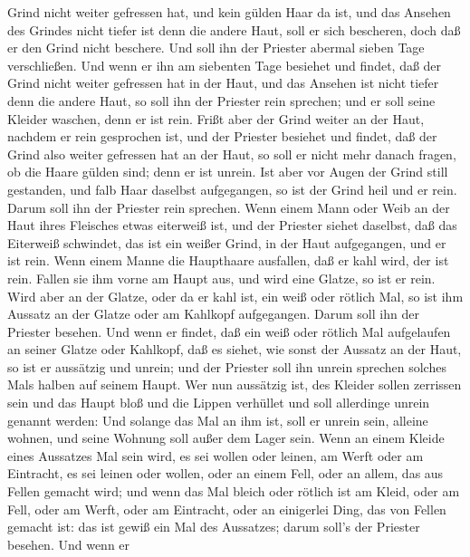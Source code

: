 Grind nicht weiter gefressen hat, und kein gülden Haar da ist, und das
Ansehen des Grindes nicht tiefer ist denn die andere Haut, 
soll er sich bescheren, doch daß er den Grind nicht beschere. Und soll
ihn der Priester abermal sieben Tage verschließen.  Und
wenn er ihn am siebenten Tage besiehet und findet, daß der Grind nicht
weiter gefressen hat in der Haut, und das Ansehen ist nicht tiefer denn
die andere Haut, so soll ihn der Priester rein sprechen; und er soll
seine Kleider waschen, denn er ist rein.  Frißt aber der
Grind weiter an der Haut, nachdem er rein gesprochen ist, 
und der Priester besiehet und findet, daß der Grind also weiter
gefressen hat an der Haut, so soll er nicht mehr danach fragen, ob die
Haare gülden sind; denn er ist unrein.  Ist aber vor Augen
der Grind still gestanden, und falb Haar daselbst aufgegangen, so ist
der Grind heil und er rein. Darum soll ihn der Priester rein sprechen.
 Wenn einem Mann oder Weib an der Haut ihres Fleisches
etwas eiterweiß ist,  und der Priester siehet daselbst, daß
das Eiterweiß schwindet, das ist ein weißer Grind, in der Haut
aufgegangen, und er ist rein.  Wenn einem Manne die
Haupthaare ausfallen, daß er kahl wird, der ist rein. 
Fallen sie ihm vorne am Haupt aus, und wird eine Glatze, so ist er rein.
 Wird aber an der Glatze, oder da er kahl ist, ein weiß
oder rötlich Mal, so ist ihm Aussatz an der Glatze oder am Kahlkopf
aufgegangen.  Darum soll ihn der Priester besehen. Und wenn
er findet, daß ein weiß oder rötlich Mal aufgelaufen an seiner Glatze
oder Kahlkopf, daß es siehet, wie sonst der Aussatz an der Haut,
 so ist er aussätzig und unrein; und der Priester soll ihn
unrein sprechen solches Mals halben auf seinem Haupt.  Wer
nun aussätzig ist, des Kleider sollen zerrissen sein und das Haupt bloß
und die Lippen verhüllet und soll allerdinge unrein genannt werden:
 Und solange das Mal an ihm ist, soll er unrein sein,
alleine wohnen, und seine Wohnung soll außer dem Lager sein.
 Wenn an einem Kleide eines Aussatzes Mal sein wird, es sei
wollen oder leinen,  am Werft oder am Eintracht, es sei
leinen oder wollen, oder an einem Fell, oder an allem, das aus Fellen
gemacht wird;  und wenn das Mal bleich oder rötlich ist am
Kleid, oder am Fell, oder am Werft, oder am Eintracht, oder an
einigerlei Ding, das von Fellen gemacht ist: das ist gewiß ein Mal des
Aussatzes; darum soll's der Priester besehen.  Und wenn er
